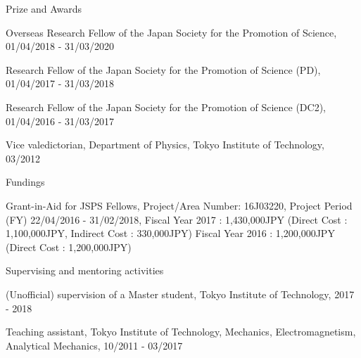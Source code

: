 \documentclass[a4paper]{resume} %
\begin{document}
\begin{rSection}{Prize and Awards}
	\begin{etaremune}

\item Overseas Research Fellow of the Japan Society for the Promotion of Science, 01/04/2018 - 31/03/2020

    \item Research Fellow of the Japan Society for the Promotion of Science (PD), 01/04/2017 - 31/03/2018

    \item Research Fellow of the Japan Society for the Promotion of Science (DC2), 01/04/2016 - 31/03/2017

    \item
Vice valedictorian, Department of Physics, Tokyo Institute of Technology, 03/2012
    
\end{etaremune}
\end{rSection}

\begin{rSection}{Fundings}
\begin{etaremune}
    \item
Grant-in-Aid for JSPS Fellows, Project/Area Number: 16J03220, Project Period (FY)    22/04/2016 - 31/02/2018,
Fiscal Year 2017 : 1,430,000JPY (Direct Cost : 1,100,000JPY, Indirect Cost : 330,000JPY)
Fiscal Year 2016 : 1,200,000JPY (Direct Cost : 1,200,000JPY)

\end{etaremune}
\end{rSection}

\begin{rSection}{Supervising and mentoring activities}
	\begin{etaremune}
    \item (Unofficial) supervision of a Master student, Tokyo Institute of Technology, 2017 - 2018
    \item Teaching assistant, Tokyo Institute of Technology, Mechanics, Electromagnetism, Analytical Mechanics, 10/2011 - 03/2017
\end{etaremune}
\end{rSection}
\end{document}
